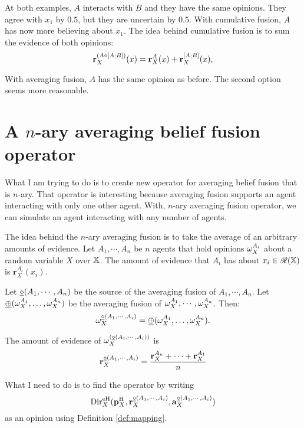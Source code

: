 \documentclass[a4paper,12pt]{article}
\theoremstyle{definition}
\theoremstyle{theorem}
\numberwithin{equation}{section}
\begin{document}
At both examples, $A$ interacts with $B$ and they have the same opinions. They agree with $x_1$ by $0.5$, but they are uncertain by $0.5$. With cumulative fusion, $A$ has now more believing about $x_1$. The idea behind cumulative fusion is to sum the evidence of both opinions:
\begin{equation}
\mathbf{r}^{(A \diamond [A; B])}_X(x) = \mathbf{r}^A_X(x) + \mathbf{r}^{[A; B]}_X(x) \text{,}
\end{equation}

With averaging fusion, $A$ has the same opinion as before. The second option seems more reasonable.


\section{A $n$-ary averaging belief fusion operator}

What I am trying to do is to create new operator for averaging belief fusion that is $n$-ary. That operator is interesting because averaging fusion supports an agent interacting with only one other agent. With, $n$-ary averaging fusion operator, we can simulate an agent interacting with any number of agents.

The idea behind the $n$-ary averaging fusion is to take the average of an arbitrary amounts of evidence. Let $A_1, \cdots, A_n$ be $n$ agents that hold opinions $\omega^{A_i}_{X}$ about a random variable $X$ over $\mathbb{X}$. The amount of evidence that $A_i$ has about $x_i \in \mathcal{R}(\mathbb{X})$ is $\mathbf{r}^{A_i}_X(x_i)$.

Let $\underline{\diamond}(A_1, \cdots, A_n)$ be the source of the averaging fusion of $A_1, \cdots, A_n$. Let $\underline{\oplus}(\omega^{A_1}_{X}, \dots, \omega^{A_n}_{X})$ be the averaging fusion of $\omega^{A_1}_{X}, \cdots, \omega^{A_n}_{X}$. Then:
\begin{equation}
\omega^{\underline{\diamond}(A_1, \cdots, A_i)}_{X} = \underline{\oplus}(\omega^{A_1}_{X}, \dots, \omega^{A_n}_{X}) \text{.}
\end{equation}

The amount of evidence of $\omega^{(\underline{\diamond}(A_1, \cdots, A_i))}_{X}$ is
\begin{equation}
\mathbf{r}^{\underline{\diamond}(A_1, \cdots, A_i)}_X = \dfrac{\mathbf{r}^{A_n}_X + \cdots + \mathbf{r}^{A_1}_X}{n} 
\end{equation}

What I need to do is to find the operator by writing
\begin{equation}
\mathrm{Dir}^{\mathrm{eH}}_X(\mathbf{p}^{\mathrm{H}}_X, \mathbf{r}^{\underline{\diamond}(A_1, \cdots, A_i)}_X, \mathbf{a}^{\underline{\diamond}(A_1, \cdots, A_i)}_{X})
\end{equation}
as an opinion using Definition \ref{def:mapping}.
\end{document}
